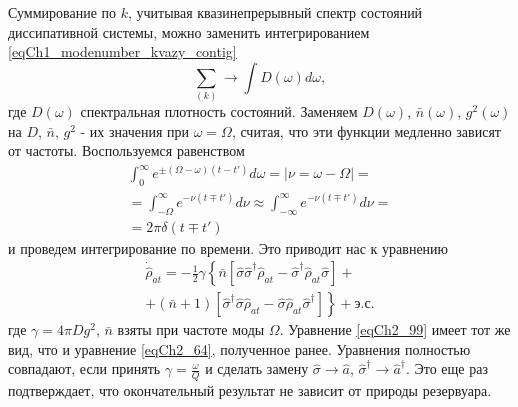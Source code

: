 Суммирование по $k$,  учитывая квазинепрерывный спектр состояний
диссипативной системы, можно заменить интегрированием
\eqref{eqCh1_modenumber_kvazy_contig} 
\[
\sum_{(k)} \rightarrow \int D\left(\omega\right)d \omega,
\]  
где $D\left(\omega\right)$ спектральная плотность состояний. Заменяем
$D\left(\omega\right)$, $\bar{n}\left(\omega\right)$,
$g^2\left(\omega\right)$ на $D$, $\bar{n}$, $g^2$ - их значения при
$\omega = \Omega$,  считая, что эти функции медленно   
зависят от частоты. Воспользуемся равенством
\begin{eqnarray}
\int_{0}^\infty
e^{\pm\left(\Omega - \omega\right)
\left(t - t'\right)}d \omega = \left|\nu = \omega - \Omega\right| =
\nonumber \\
=
\int_{-\Omega}^\infty
e^{ - \nu
\left(t \mp t'\right)}d \nu \approx
\int_{-\infty}^\infty
e^{ - \nu
\left(t \mp t'\right)}d \nu = 
\nonumber \\
= 2 \pi \delta \left(t \mp t'\right) 
\label{eqCh2_98}
\end{eqnarray}
и проведем интегрирование по времени. Это приводит нас к уравнению 
\begin{eqnarray}
\dot{\hat{\rho}}_{at} = -\frac{1}{2}\gamma \left\{
\bar{n}\left[
\hat{\sigma}\hat{\sigma}^{\dag}\hat{\rho}_{at} -
\hat{\sigma}^{\dag}\hat{\rho}_{at}\hat{\sigma}
\right] +
\right.
\nonumber \\
+
\left.
\left(\bar{n} + 1\right)\left[
\hat{\sigma}^{\dag}\hat{\sigma}\hat{\rho}_{at} -
\hat{\sigma}\hat{\rho}_{at}\hat{\sigma}^{\dag}
\right]
\right\}
+ \mbox{э.с.}
\label{eqCh2_99}
\end{eqnarray}
где $\gamma =4 \pi D g^2$, $\bar{n}$ взяты при частоте моды $\Omega$.
Уравнение \eqref{eqCh2_99} имеет тот же вид, что и уравнение
\eqref{eqCh2_64}, полученное ранее. Уравнения 
полностью совпадают, если  принять $\gamma = \frac{\omega}{Q}$ и
сделать замену $\hat{\sigma} \rightarrow \hat{a}$, $\hat{\sigma}^{\dag}
\rightarrow \hat{a}^{\dag}$.  Это еще раз подтверждает, что окончательный
результат не зависит от природы резервуара.   

